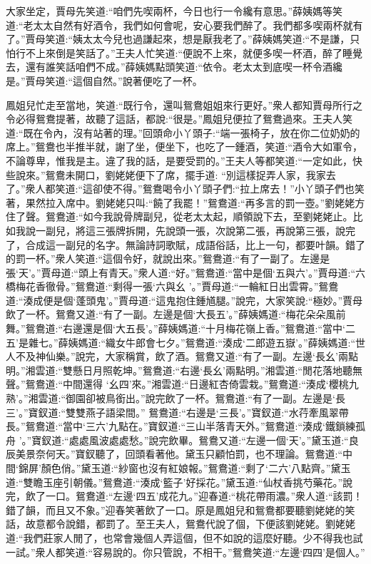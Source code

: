 \begin{parag}
    大家坐定，賈母先笑道:“咱們先喫兩杯，今日也行一令纔有意思。”薛姨媽等笑道:“老太太自然有好酒令，我們如何會呢，安心要我們醉了。我們都多喫兩杯就有了。”賈母笑道:“姨太太今兒也過謙起來，想是厭我老了。”薛姨媽笑道:“不是謙，只怕行不上來倒是笑話了。”王夫人忙笑道:“便說不上來，就便多喫一杯酒，醉了睡覺去，還有誰笑話咱們不成。”薛姨媽點頭笑道:“依令。老太太到底喫一杯令酒纔是。”賈母笑道:“這個自然。”說著便吃了一杯。
\end{parag}


\begin{parag}
    鳳姐兒忙走至當地，笑道:“既行令，還叫鴛鴦姐姐來行更好。”衆人都知賈母所行之令必得鴛鴦提著，故聽了這話，都說:“很是。”鳳姐兒便拉了鴛鴦過來。王夫人笑道:“既在令內，沒有站著的理。”回頭命小丫頭子:“端一張椅子，放在你二位奶奶的席上。”鴛鴦也半推半就，謝了坐，便坐下，也吃了一鍾酒，笑道:“酒令大如軍令，不論尊卑，惟我是主。違了我的話，是要受罰的。”王夫人等都笑道:“一定如此，快些說來。”鴛鴦未開口，劉姥姥便下了席，擺手道: “別這樣捉弄人家，我家去了。”衆人都笑道:“這卻使不得。”鴛鴦喝令小丫頭子們:“拉上席去！”小丫頭子們也笑著，果然拉入席中。劉姥姥只叫:“饒了我罷！”鴛鴦道:“再多言的罰一壺。”劉姥姥方住了聲。鴛鴦道:“如今我說骨牌副兒，從老太太起，順領說下去，至劉姥姥止。比如我說一副兒，將這三張牌拆開，先說頭一張，次說第二張，再說第三張，說完了，合成這一副兒的名字。無論詩詞歌賦，成語俗話，比上一句，都要叶韻。錯了的罰一杯。”衆人笑道:“這個令好，就說出來。”鴛鴦道:“有了一副了。左邊是張‘天’。”賈母道:“頭上有青天。”衆人道:“好。”鴛鴦道:“當中是個‘五與六’。”賈母道:“六橋梅花香徹骨。”鴛鴦道:“剩得一張‘六與幺 ’。”賈母道:“一輪紅日出雲霄。”鴛鴦道:“湊成便是個‘蓬頭鬼’。”賈母道:“這鬼抱住鍾馗腿。”說完，大家笑說:“極妙。”賈母飲了一杯。鴛鴦又道:“有了一副。左邊是個‘大長五’。”薛姨媽道:“梅花朵朵風前舞。”鴛鴦道:“右邊還是個‘大五長’。”薛姨媽道:“十月梅花嶺上香。”鴛鴦道:“當中‘二五’是雜七。”薛姨媽道:“織女牛郎會七夕。”鴛鴦道:“湊成‘二郎遊五嶽’。”薛姨媽道:“世人不及神仙樂。”說完，大家稱賞，飲了酒。鴛鴦又道:“有了一副。左邊‘長幺’兩點明。”湘雲道:“雙懸日月照乾坤。”鴛鴦道:“右邊‘長幺’兩點明。”湘雲道:“閒花落地聽無聲。”鴛鴦道:“中間還得 ‘幺四’來。”湘雲道:“日邊紅杏倚雲栽。”鴛鴦道:“湊成‘櫻桃九熟’。”湘雲道:“御園卻被鳥銜出。”說完飲了一杯。鴛鴦道:“有了一副。左邊是‘長三’。”寶釵道:“雙雙燕子語梁間。” 鴛鴦道:“右邊是‘三長’。”寶釵道:“水荇牽風翠帶長。”鴛鴦道:“當中‘三六’九點在。”寶釵道:“三山半落青天外。”鴛鴦道:“湊成‘鐵鎖練孤舟 ’。”寶釵道:“處處風波處處愁。”說完飲畢。鴛鴦又道:“左邊一個‘天’。”黛玉道:“良辰美景奈何天。”寶釵聽了，回頭看著他。黛玉只顧怕罰，也不理論。鴛鴦道:“中間‘錦屏’顏色俏。”黛玉道:“紗窗也沒有紅娘報。”鴛鴦道:“剩了‘二六’八點齊。”黛玉道:“雙瞻玉座引朝儀。”鴛鴦道:“湊成‘籃子’好採花。”黛玉道:“仙杖香挑芍藥花。”說完，飲了一口。鴛鴦道:“左邊‘四五’成花九。”迎春道:“桃花帶雨濃。”衆人道:“該罰！錯了韻，而且又不象。”迎春笑著飲了一口。原是鳳姐兒和鴛鴦都要聽劉姥姥的笑話，故意都令說錯，都罰了。至王夫人，鴛鴦代說了個，下便該劉姥姥。劉姥姥道:“我們莊家人閒了，也常會幾個人弄這個，但不如說的這麼好聽。少不得我也試一試。”衆人都笑道:“容易說的。你只管說，不相干。”鴛鴦笑道:“左邊‘四四’是個人。” 
\end{parag}
